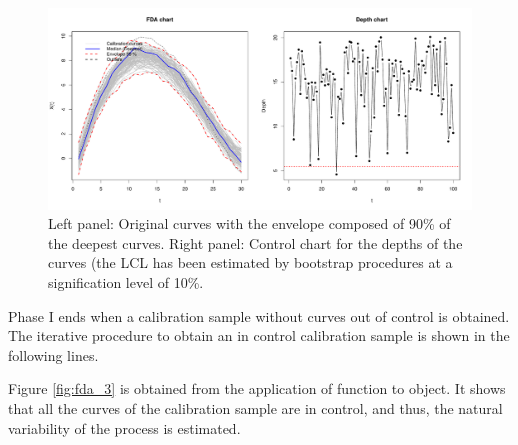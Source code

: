 \begin{figure}[!htb]
\begin{center}
\includegraphics[width=\textwidth]{fda_2}
\caption{Left panel: Original curves with the envelope composed of 90\% of the deepest curves. Right panel: Control chart for the depths of the curves (the LCL has been estimated by bootstrap procedures at a signification level of 10\%.}
\label{fig:fda_2}
\end{center}
\end{figure}

Phase I ends when a calibration sample without curves out of control is obtained. The iterative procedure to obtain an in control calibration sample is shown in the following lines.


Figure \ref{fig:fda_3} is obtained from the application of  function to  object. It shows that all the curves of the calibration sample are in control, and thus, the natural variability of the process is estimated.

